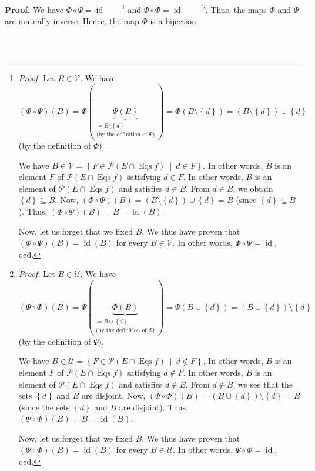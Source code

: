 \documentclass[numbers=enddot,12pt,final,onecolumn,notitlepage]{scrartcl}%
\theoremstyle{definition}
\newenvironment{proof}[1][Proof]{\noindent\textbf{#1.} }{\ \rule{0.5em}{0.5em}}
\newenvironment{verlong}{}{}
\begin{document}
\begin{verlong}
\begin{proof}
We have $\Phi\circ\Psi=\operatorname*{id}$\ \ \ \ \footnote{\textit{Proof.}
Let $B\in\mathcal{V}$. We have%
\[
\left(  \Phi\circ\Psi\right)  \left(  B\right)  =\Phi\left(  \underbrace{\Psi
\left(  B\right)  }_{\substack{=B\setminus\left\{  d\right\}  \\\text{(by the
definition of }\Psi\text{)}}}\right)  =\Phi\left(  B\setminus\left\{
d\right\}  \right)  =\left(  B\setminus\left\{  d\right\}  \right)
\cup\left\{  d\right\}
\]
(by the definition of $\Phi$).
\par
We have $B\in\mathcal{V}=\left\{  F\in\mathcal{P}\left(  E\cap
\operatorname*{Eqs}f\right)  \ \mid\ d\in F\right\}  $. In other words, $B$ is
an element $F$ of $\mathcal{P}\left(  E\cap\operatorname*{Eqs}f\right)  $
satisfying $d\in F$. In other words, $B$ is an element of $\mathcal{P}\left(
E\cap\operatorname*{Eqs}f\right)  $ and satisfies $d\in B$. From $d\in B$, we
obtain $\left\{  d\right\}  \subseteq B$. Now, $\left(  \Phi\circ\Psi\right)
\left(  B\right)  =\left(  B\setminus\left\{  d\right\}  \right)  \cup\left\{
d\right\}  =B$ (since $\left\{  d\right\}  \subseteq B$). Thus, $\left(
\Phi\circ\Psi\right)  \left(  B\right)  =B=\operatorname*{id}\left(  B\right)
$.
\par
Now, let us forget that we fixed $B$. We thus have proven that $\left(
\Phi\circ\Psi\right)  \left(  B\right)  =\operatorname*{id}\left(  B\right)  $
for every $B\in\mathcal{V}$. In other words, $\Phi\circ\Psi=\operatorname*{id}%
$, qed.} and $\Psi\circ\Phi=\operatorname*{id}$%
\ \ \ \ \footnote{\textit{Proof.} Let $B\in\mathcal{U}$. We have%
\[
\left(  \Psi\circ\Phi\right)  \left(  B\right)  =\Psi\left(  \underbrace{\Phi
\left(  B\right)  }_{\substack{=B\cup\left\{  d\right\}  \\\text{(by the
definition of }\Phi\text{)}}}\right)  =\Psi\left(  B\cup\left\{  d\right\}
\right)  =\left(  B\cup\left\{  d\right\}  \right)  \setminus\left\{
d\right\}
\]
(by the definition of $\Psi$).
\par
We have $B\in\mathcal{U}=\left\{  F\in\mathcal{P}\left(  E\cap
\operatorname*{Eqs}f\right)  \ \mid\ d\notin F\right\}  $. In other words, $B$
is an element $F$ of $\mathcal{P}\left(  E\cap\operatorname*{Eqs}f\right)  $
satisfying $d\notin F$. In other words, $B$ is an element of $\mathcal{P}%
\left(  E\cap\operatorname*{Eqs}f\right)  $ and satisfies $d\notin B$. From
$d\notin B$, we see that the sets $\left\{  d\right\}  $ and $B$ are disjoint.
Now, $\left(  \Psi\circ\Phi\right)  \left(  B\right)  =\left(  B\cup\left\{
d\right\}  \right)  \setminus\left\{  d\right\}  =B$ (since the sets $\left\{
d\right\}  $ and $B$ are disjoint). Thus, $\left(  \Psi\circ\Phi\right)
\left(  B\right)  =B=\operatorname*{id}\left(  B\right)  $.
\par
Now, let us forget that we fixed $B$. We thus have proven that $\left(
\Psi\circ\Phi\right)  \left(  B\right)  =\operatorname*{id}\left(  B\right)  $
for every $B\in\mathcal{U}$. In other words, $\Psi\circ\Phi=\operatorname*{id}%
$, qed.}. Thus, the maps $\Phi$ and $\Psi$ are mutually inverse. Hence, the
map $\Phi$ is a bijection.


\end{proof}
\end{verlong}
\end{document}
